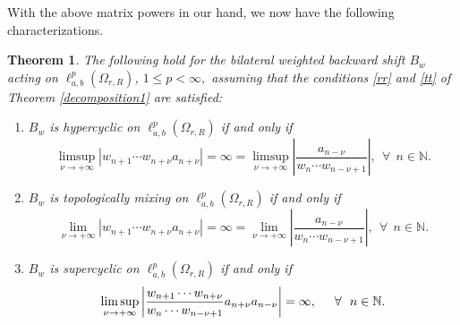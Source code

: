 \documentclass[12pt, reqno]{amsart}
\newtheorem{theorem}{Theorem}[section]
\theoremstyle{definition}
\theoremstyle{remark}
\numberwithin{equation}{section}
\begin{document}
With the above matrix powers in our hand, we now have the following characterizations.
 \begin{theorem}\label{hyper5}
      The following hold for the bilateral weighted backward shift $B_{w}$ acting on  $\ell^{p}_{a,b}(\Omega_{r,R})$, $1\leq p<\infty,$ assuming that the conditions \eqref{rr} and \eqref{tt} of Theorem \ref{decomposition1} are satisfied:
     \begin{enumerate}
      \item[(i)] $B_{w}$ is hypercyclic on $\ell^{p}_{a,b}(\Omega_{r,R})$ if and only if
         \begin{equation}\label{hyperc}
              \limsup_{\nu\rightarrow +\infty}\left\lvert w_{n+1}\cdots w_{n+\nu}{a_{n+\nu}}   
 \right\rvert=\infty= \limsup_{\nu\rightarrow +\infty} \left\lvert \frac{a_{n-\nu}}{w_{n}\cdots w_{n-\nu+1}} \right\rvert,~~ \forall~~ n\in \mathbb{N}.
        \end{equation}
         \item[(ii)] $B_{w}$ is topologically mixing on $\ell^{p}_{a,b}(\Omega_{r,R})$ if and only if
         \begin{equation}\label{mixing}
         \lim_{\nu\rightarrow +\infty}\left\lvert w_{n+1}\cdots w_{n+\nu}{a_{n+\nu}}   
 \right\rvert=\infty= \lim_{\nu\rightarrow +\infty} \left\lvert \frac{a_{n-\nu}}{w_{n}\cdots w_{n-\nu+1}}\right\rvert,~~ \forall~~ n\in \mathbb{N}.
         \end{equation}

         \item[(iii)] $B_{w}$ is supercyclic on $\ell^{p}_{a,b}(\Omega_{r,R})$ if and only if
         \begin{equation}\label{superc}
         \limsup_{\nu\rightarrow +\infty} \left\lvert 
         \frac{w_{n+1}\cdots w_{n+\nu}}{w_{n}\cdots w_{n-\nu+1}}
          a_{n+\nu}a_{n-\nu}\right\rvert=\infty, \hskip .5cm \forall~~ n\in \mathbb{N}.
         \end{equation}
        \end{enumerate}
    \end{theorem}
\end{document}

